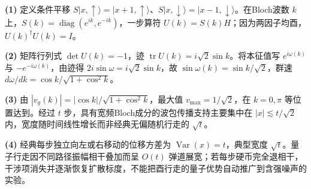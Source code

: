 \par\noindent\textbf{(1)} 定义条件平移 \(S|x,\uparrow\rangle=|x+1,\uparrow\rangle\)、\(S|x,\downarrow\rangle=|x-1,\downarrow\rangle\)。在Bloch波数 \(k\) 上，\(S(k)=\operatorname{diag}(e^{ik},e^{-ik})\)，一步算符 \(U(k)=S(k)H\)；因为两因子均酉，\(U(k)^\dagger U(k)=I\)。
\par\noindent\textbf{(2)} 矩阵行列式 \(\det U(k)=-1\)，迹 \(\operatorname{tr}U(k)=i\sqrt2\sin k\)。将本征值写 \(e^{i\omega(k)}\) 与 \(-e^{-i\omega(k)}\)，由迹得 \(2i\sin\omega=i\sqrt2\sin k\)，故 \(\sin\omega(k)=\sin k/\sqrt2\)，群速 \(d\omega/dk=\cos k/\sqrt{1+\cos^2 k}\)。
\par\noindent\textbf{(3)} 由 \(|v_g(k)|=|\cos k|/\sqrt{1+\cos^2k}\)，最大值 \(v_{\max}=1/\sqrt2\)，在 \(k=0,\pi\) 等位置达到。经过 \(t\) 步，具有宽频Bloch成分的波包传播支持主要集中在 \(|x|\lesssim t/\sqrt2\) 内，宽度随时间线性增长而非经典无偏随机行走的 \(\sqrt t\)。
\par\noindent\textbf{(4)} 经典每步独立向左或右移动的位移方差为 \(\operatorname{Var}(x)=t\)，典型宽度 \(\sqrt t\)。量子行走因不同路径振幅相干叠加而呈 \(O(t)\) 弹道展宽；若每步硬币完全退相干，干涉项消失并逐渐恢复扩散标度，不能把酉行走的量子优势自动推广到含强噪声的实验。
